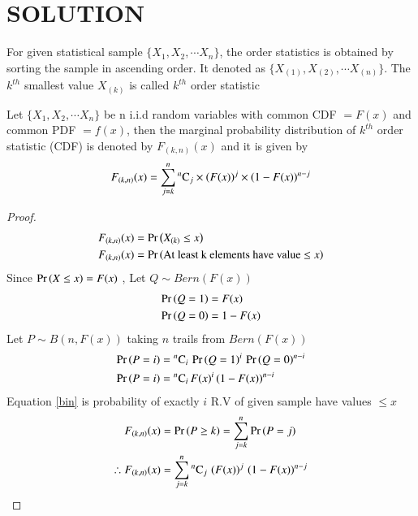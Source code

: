 \documentclass[journal,12pt,twocolumn]{IEEEtran}
\begin{document}
\section{SOLUTION}
\begin{definition}
For given statistical sample $\{X_1, X_2,\cdots X_n\}$, the order statistics is obtained by sorting the
sample in ascending order. It denoted as $\{X_{(1)}, X_{(2)},\cdots X_{(n)}\}$. The $k^{th}$ smallest value
$X_{(k)}$ is called  $k^{th}$ order statistic 
\end{definition}
\begin{theorem}
Let $\{X_1, X_2, \cdots X_n\}$ be n i.i.d random variables with common CDF $= F(x)$ and common PDF $= f(x)$, 
then the marginal probability distribution of $k^{th}$ order statistic (CDF) is denoted by $F_{(k,n)}(x)$ 
and it is given by
\begin{align}
F_{(k,n)}(x) =  \sum_{j=k}^{n}{}^{n}\mathrm{C}_{j}\times \left(F(x)\right)^{j}\times\left(1-F(x)\right)^{n-j} \label{eqn_1}
\end{align}
\label{th1}
\end{theorem}
\begin{proof}
\begin{align}
F_{(k,n)}(x) &= \Pr\left(X_{(k)}\leq x\right) \\
F_{(k,n)}(x) &= \Pr\left(\text{At least k elements have value $\leq x$}\right) \label{kcdf}
\end{align}
Since $\Pr\left(X\leq x\right) = F(x)$ , Let $ Q \sim Bern(F(x))$
\begin{align}
\Pr\left(Q=1\right) &= F(x) \\
\Pr\left(Q=0\right) &= 1-F(x)
\end{align}
Let $P \sim B(n,F(x))$ taking $n$ trails from $Bern(F(x))$    
\begin{align}
\Pr\left(P=i\right) &= {}^{n}\mathrm{C}_{i}\,\Pr\left(Q=1\right)^{i}\,\Pr\left(Q=0\right)^{n-i} \\
\Pr\left(P=i\right) &= {}^{n}\mathrm{C}_{i}\,F(x)^{i}\,(1-F(x))^{n-i}\label{bin}  
\end{align}
Equation \eqref{bin} is probability of exactly $i$ R.V of given sample have values $\leq x$   
\begin{align}
 F_{(k,n)}(x) &= \Pr\left(P\geq k\right) =  \sum_{j=k}^{n} \Pr\left(P=j\right) \\
\therefore F_{(k,n)}(x) &=  \sum_{j=k}^{n}{}^{n}\mathrm{C}_{j}\, \left(F(x)\right)^{j}\,\left(1-F(x)\right)^{n-j} 
\end{align}
\end{proof}
\end{document}
